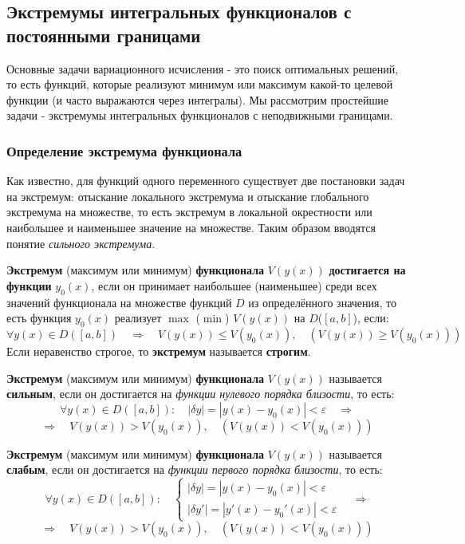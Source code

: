 \documentclass[12pt, a4paper]{article}
\begin{document}
\subsection{Экстремумы интегральных функционалов с постоянными границами}

Основные задачи вариационного исчисления - это поиск оптимальных решений, то есть функций, которые реализуют минимум или максимум какой-то целевой функции (и часто выражаются через интегралы). Мы рассмотрим простейшие задачи - экстремумы интегральных функционалов с неподвижными границами.

\subsubsection{Определение экстремума функционала}

Как известно, для функций одного переменного существует две постановки задач на экстремум: отыскание локального экстремума и отыскание глобального экстремума на множестве, то есть экстремум в локальной окрестности или наибольшее и наименьшее значение на множестве. Таким образом вводятся понятие \textit{сильного экстремума}.

\textbf{Экстремум} (максимум или минимум) \textbf{функционала} $V(y(x))$ \textbf{достигается на функции} $y_0(x)$, если он принимает наибольшее (наименьшее) среди всех значений функционала на множестве функций $D$ из определённого значения, то есть функция $y_0(x)$ реализует $\max$ ($\min$) $V(y(x))$ на $D$($[a,b]$), если:
\[\forall y(x) \in D([a, b]) \quad \Rightarrow \quad V(y(x)) \leq V(y_0(x)), \quad (V(y(x)) \geq V(y_0(x))) \]
Если неравенство строгое, то \textbf{экстремум} называется \textbf{строгим}.

\textbf{Экстремум} (максимум или минимум) \textbf{функционала} $V(y(x))$ называется \textbf{сильным}, если он достигается на \textit{функции нулевого порядка близости}, то есть:
\[\forall y(x) \in D([a, b]): \quad |\delta y| = |y(x) - y_0(x)| < \varepsilon \quad \Rightarrow \]
\[\Rightarrow \quad V(y(x)) > V(y_0(x)), \quad (V(y(x)) < V(y_0(x))) \]

\textbf{Экстремум} (максимум или минимум) \textbf{функционала} $V(y(x))$ называется \textbf{слабым}, если он достигается на \textit{функции первого порядка близости}, то есть:
\[\forall y(x) \in D([a, b]): \quad \begin{cases} |\delta y| = |y(x) - y_0(x)| < \varepsilon \\ |\delta y'| = |y'(x) - y_0'(x)| < \varepsilon \end{cases} \quad \Rightarrow\]
\[\Rightarrow \quad V(y(x)) > V(y_0(x)), \quad (V(y(x)) < V(y_0(x))) \]
\end{document}
